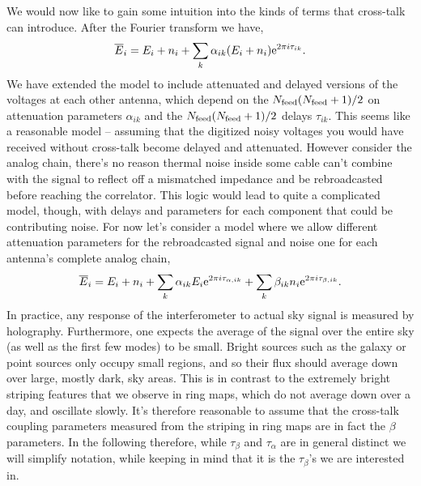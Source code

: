 We would now like to gain some intuition into the kinds of terms that cross-talk can introduce. After the Fourier transform we have,
\begin{equation}
\overline{E}_i = E_i + n_i + \sum_{k} \alpha_{ik} (E_i + n_i) {\rm e}^{2\pi i \tau_{ik}}. \label{pre-xtalkmodel}
\end{equation}
We have extended the model to include attenuated and delayed versions of the voltages at each other antenna, which depend on the $N_{\rm feed}(N_{\rm feed} + 1)/2$ on attenuation parameters $\alpha_{ik}$ and the $N_{\rm feed}(N_{\rm feed} + 1)/2$ delays $\tau_{ik}$. This seems like a reasonable model -- assuming that the digitized noisy voltages you would have received without cross-talk become delayed and attenuated. However consider the analog chain, there's no reason thermal noise inside some cable can't combine with the signal to reflect off a mismatched impedance and be rebroadcasted before reaching the correlator. This logic would lead to quite a complicated model, though, with delays and parameters for each component that could be contributing noise. For now let's consider a model where we allow different attenuation parameters for the rebroadcasted signal and noise one for each antenna's complete analog chain,
\begin{align}
\overline{E}_i = E_i + n_i + \sum_{k} \alpha_{ik} E_i {\rm e}^{2\pi i \tau_{\alpha,ik}} + \sum_{k} \beta_{ik} n_i {\rm e}^{2\pi i \tau_{\beta,ik}}. \label{xtalkmodel}
\end{align}
In practice, any response of the interferometer to actual sky signal is measured by holography. Furthermore, one expects the average of the signal over the entire sky (as well as the first few modes) to be small. Bright sources such as the galaxy or point sources only occupy small regions, and so their flux should average down over large, mostly dark, sky areas. This is in contrast to the extremely bright striping features that we observe in ring maps, which do not average down over a day, and oscillate slowly. It's therefore reasonable to assume that the cross-talk coupling parameters measured from the striping in ring maps are in fact the $\beta$ parameters. In the following therefore, while $\tau_\beta$ and $\tau_\alpha$ are in general distinct we will simplify notation, while keeping in mind that it is the $\tau_\beta$'s we are interested in.

